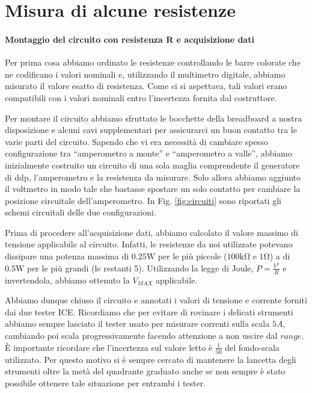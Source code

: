 \section{Misura di alcune resistenze}
\paragraph{Montaggio del circuito con resistenza R e acquisizione dati\\}
Per prima cosa abbiamo ordinato le resistenze controllando le barre colorate che ne codificano  i valori nominali e, utilizzando il multimetro digitale, abbiamo misurato il valore esatto di resistenza. Come ci si aspettava, tali valori erano compatibili con i valori nominali entro l'incertezza fornita dal costruttore.

Per montare il circuito abbiamo sfruttato le bocchette della breadboard a nostra disposizione e alcuni cavi supplementari per assicurarci un buon contatto tra le varie parti del circuito.
Sapendo che vi era necessità di cambiare spesso configurazione tra ``amperometro a monte'' e ``amperometro a valle'', abbiamo inizialmente costruito un circuito di una sola maglia comprendente il generatore di ddp, l'amperometro e la resistenza da misurare. 
Solo allora abbiamo aggiunto il voltmetro in modo tale che bastasse spostare un solo contatto per cambiare la posizione circuitale dell'amperometro. In Fig. \ref{fig:circuiti} sono riportati gli schemi circuitali delle due configurazioni.

Prima di procedere all'acquisizione dati, abbiamo calcolato il valore massimo di tensione applicabile al circuito. Infatti, le resistenze da noi utilizzate potevano dissipare una potenza massima di $0.25\si{\watt}$ per le più piccole ($100 \si{\kilo\ohm}$ e $1\si{\ohm}$) a di $0.5\si{\watt}$ per le più grandi (le restanti 5). Utilizzando la legge di Joule, $P=\frac{V^2}{R}$ e invertendola, abbiamo ottenuto la $V_{MAX}$ applicabile. %

Abbiamo dunque chiuso il circuito e annotati i valori di tensione e corrente forniti dai due tester ICE. Ricordiamo che per evitare di rovinare i delicati strumenti abbiamo sempre lasciato il tester usato per misurare correnti sulla scala $5A$, cambiando poi scala progressivamente facendo attenzione a non uscire dal $range$. È importante ricordare che l'incertezza sul valore letto è $\frac{1}{50}$ del fondo-scala utilizzato. Per questo motivo si è sempre cercato di mantenere la lancetta degli strumenti oltre la metà del quadrante graduato anche se non sempre è stato possibile ottenere tale situazione per entrambi i tester.

